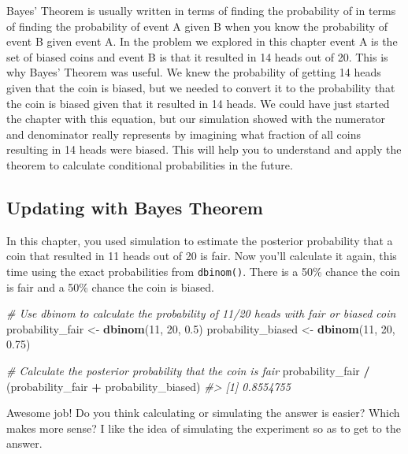 \documentclass[]{article}
\newenvironment{Shaded}{\begin{snugshade}}{\end{snugshade}}
\newcommand{\CommentTok}[1]{\textcolor[rgb]{0.56,0.35,0.01}{\textit{#1}}}
\newcommand{\DecValTok}[1]{\textcolor[rgb]{0.00,0.00,0.81}{#1}}
\newcommand{\FloatTok}[1]{\textcolor[rgb]{0.00,0.00,0.81}{#1}}
\newcommand{\KeywordTok}[1]{\textcolor[rgb]{0.13,0.29,0.53}{\textbf{#1}}}
\newcommand{\NormalTok}[1]{#1}
\newcommand{\OperatorTok}[1]{\textcolor[rgb]{0.81,0.36,0.00}{\textbf{#1}}}
\newcommand{\StringTok}[1]{\textcolor[rgb]{0.31,0.60,0.02}{#1}}
\begin{document}
Bayes' Theorem is usually written in terms of finding the probability of
in terms of finding the probability of event A given B when you know the
probability of event B given event A. In the problem we explored in this
chapter event A is the set of biased coins and event B is that it
resulted in 14 heads out of 20. This is why Bayes' Theorem was useful.
We knew the probability of getting 14 heads given that the coin is
biased, but we needed to convert it to the probability that the coin is
biased given that it resulted in 14 heads. We could have just started
the chapter with this equation, but our simulation showed with the
numerator and denominator really represents by imagining what fraction
of all coins resulting in 14 heads were biased. This will help you to
understand and apply the theorem to calculate conditional probabilities
in the future.

\hypertarget{updating-with-bayes-theorem}{%
\subsection{Updating with Bayes
Theorem}\label{updating-with-bayes-theorem}}

In this chapter, you used simulation to estimate the posterior
probability that a coin that resulted in 11 heads out of 20 is fair. Now
you'll calculate it again, this time using the exact probabilities from
\texttt{dbinom()}. There is a 50\% chance the coin is fair and a 50\%
chance the coin is biased.

\begin{Shaded}
\begin{Highlighting}[]
\CommentTok{# Use dbinom to calculate the probability of 11/20 heads with fair or biased coin}
\NormalTok{probability_fair <-}\StringTok{ }\KeywordTok{dbinom}\NormalTok{(}\DecValTok{11}\NormalTok{, }\DecValTok{20}\NormalTok{, }\FloatTok{0.5}\NormalTok{)}
\NormalTok{probability_biased <-}\StringTok{ }\KeywordTok{dbinom}\NormalTok{(}\DecValTok{11}\NormalTok{, }\DecValTok{20}\NormalTok{, }\FloatTok{0.75}\NormalTok{)}

\CommentTok{# Calculate the posterior probability that the coin is fair}
\NormalTok{probability_fair }\OperatorTok{/}\StringTok{ }\NormalTok{(probability_fair }\OperatorTok{+}\StringTok{ }\NormalTok{probability_biased)}
\CommentTok{#> [1] 0.8554755}
\end{Highlighting}
\end{Shaded}

Awesome job! Do you think calculating or simulating the answer is
easier? Which makes more sense? I like the idea of simulating the
experiment so as to get to the answer.
\end{document}
